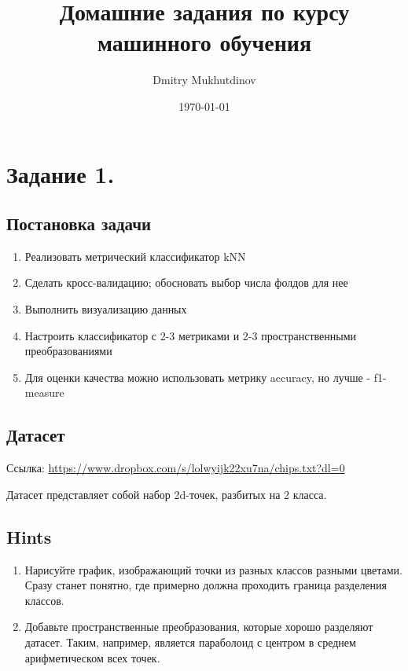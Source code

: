 \documentclass[a4paper, unicode]{article}
\author{Dmitry Mukhutdinov}
\date{\today}
\title{Домашние задания по курсу машинного обучения}
\begin{document}
\maketitle
\tableofcontents


\section{Задание 1.}
\label{sec:orgheadline5}
\subsection{Постановка задачи}
\label{sec:orgheadline1}
\begin{enumerate}
\item Реализовать метрический классификатор kNN
\item Сделать кросс-валидацию; обосновать выбор числа фолдов для нее
\item Выполнить визуализацию данных
\item Настроить классификатор с 2-3 метриками и 2-3 пространственными преобразованиями
\item Для оценки качества можно использовать метрику accuracy, но лучше - f1-measure
\end{enumerate}
\subsection{Датасет}
\label{sec:orgheadline2}
Ссылка: \url{https://www.dropbox.com/s/lolwyijk22xu7na/chips.txt?dl=0}

Датасет представляет собой набор 2d-точек, разбитых на 2 класса.
\subsection{Hints}
\label{sec:orgheadline3}
\begin{enumerate}
\item Нарисуйте график, изображающий точки из разных классов разными цветами. Сразу
станет понятно, где примерно должна проходить граница разделения классов.
\item Добавьте пространственные преобразования, которые хорошо разделяют датасет.
Таким, например, является параболоид с центром в среднем арифметическом всех точек.
\end{enumerate}
\end{document}
